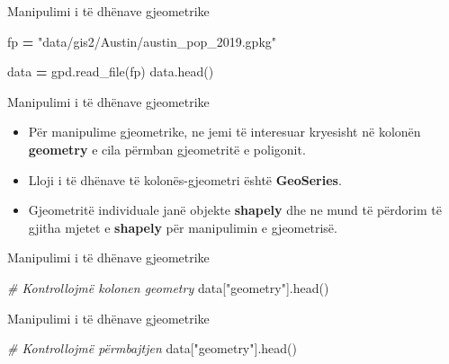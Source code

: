\documentclass[
  ignorenonframetext,
]{beamer}
\newenvironment{Shaded}{\begin{snugshade}}{\end{snugshade}}
\newcommand{\CommentTok}[1]{\textcolor[rgb]{0.56,0.35,0.01}{\textit{#1}}}
\newcommand{\NormalTok}[1]{#1}
\newcommand{\OperatorTok}[1]{\textcolor[rgb]{0.81,0.36,0.00}{\textbf{#1}}}
\newcommand{\StringTok}[1]{\textcolor[rgb]{0.31,0.60,0.02}{#1}}
\begin{document}
\begin{frame}[fragile]{Manipulimi i të dhënave gjeometrike}
\protect\hypertarget{manipulimi-i-tuxeb-dhuxebnave-gjeometrike-4}{}

\begin{Shaded}
\begin{Highlighting}[]
\NormalTok{fp }\OperatorTok{=} \StringTok{"data/gis2/Austin/austin\_pop\_2019.gpkg"}

\NormalTok{data }\OperatorTok{=}\NormalTok{ gpd.read\_file(fp)}
\NormalTok{data.head()}
\end{Highlighting}
\end{Shaded}
\end{frame}

\begin{frame}{Manipulimi i të dhënave gjeometrike}
\protect\hypertarget{manipulimi-i-tuxeb-dhuxebnave-gjeometrike-5}{}
\begin{itemize}
\item
  Për manipulime gjeometrike, ne jemi të interesuar kryesisht në kolonën
  \textbf{geometry} e cila përmban gjeometritë e poligonit.
\item
  Lloji i të dhënave të kolonës-gjeometri është \textbf{GeoSeries}.
\item
  Gjeometritë individuale janë objekte \textbf{shapely} dhe ne mund të
  përdorim të gjitha mjetet e \textbf{shapely} për manipulimin e
  gjeometrisë.
\end{itemize}
\end{frame}

\begin{frame}[fragile]{Manipulimi i të dhënave gjeometrike}
\protect\hypertarget{manipulimi-i-tuxeb-dhuxebnave-gjeometrike-6}{}

\begin{Shaded}
\begin{Highlighting}[]
\CommentTok{\# Kontrollojmë kolonen geometry}
\NormalTok{data[}\StringTok{"geometry"}\NormalTok{].head()}
\end{Highlighting}
\end{Shaded}
\end{frame}

\begin{frame}[fragile]{Manipulimi i të dhënave gjeometrike}
\protect\hypertarget{manipulimi-i-tuxeb-dhuxebnave-gjeometrike-7}{}

\begin{Shaded}
\begin{Highlighting}[]
\CommentTok{\# Kontrollojmë përmbajtjen}
\NormalTok{data[}\StringTok{"geometry"}\NormalTok{].head()}
\end{Highlighting}
\end{Shaded}
\end{frame}
\end{document}
